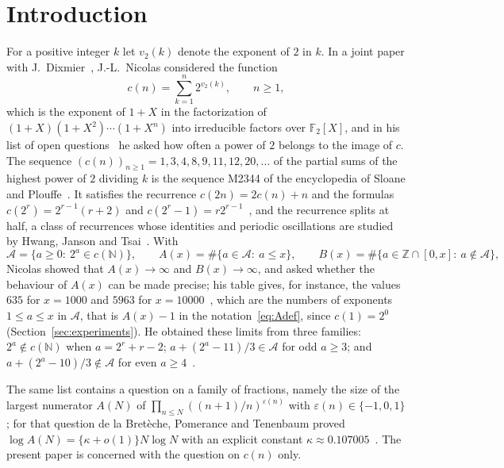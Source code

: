 \documentclass[11pt]{amsart}
\theoremstyle{definition}
\begin{document}
\section{Introduction}
\label{sec:intro}
For a positive integer $k$ let $v_2(k)$ denote the exponent of $2$ in $k$. In a joint paper with J.~Dixmier~\cite{dixmiernicolas2002}, J.-L.~Nicolas considered the function
\begin{equation}
\label{eq:cdef}
c(n)=\sum_{k=1}^{n}2^{v_2(k)},\qquad n\ge1,
\end{equation}
which is the exponent of $1+X$ in the factorization of $(1+X)(1+X^2)\cdots(1+X^n)$ into irreducible factors over $\mathbb{F}_2[X]$, and in his list of open questions~\cite{nicolas2005open} he asked how often a power of $2$ belongs to the image of $c$. The sequence $(c(n))_{n\ge1}=1,3,4,8,9,11,12,20,\dots$ of the partial sums of the highest power of $2$ dividing $k$ is the sequence M2344 of the encyclopedia of Sloane and Plouffe~\cite{sloaneplouffe1995}. It satisfies the recurrence $c(2n)=2c(n)+n$ and the formulas $c(2^r)=2^{r-1}(r+2)$ and $c(2^r-1)=r2^{r-1}$~\cite{nicolas2005open}, and the recurrence splits at half, a class of recurrences whose identities and periodic oscillations are studied by Hwang, Janson and Tsai~\cite{hwangjansontsai2024}. With
\begin{equation}
\label{eq:Adef}
\mathcal{A}=\{a\ge0:\ 2^a\in c(\mathbb{N})\},\qquad A(x)=\#\{a\in\mathcal{A}:\ a\le x\},\qquad B(x)=\#\{a\in\mathbb{Z}\cap[0,x]:\ a\notin\mathcal{A}\},
\end{equation}
Nicolas showed that $A(x)\to\infty$ and $B(x)\to\infty$, and asked whether the behaviour of $A(x)$ can be made precise; his table gives, for instance, the values $635$ for $x=1000$ and $5963$ for $x=10000$~\cite{nicolas2005open}, which are the numbers of exponents $1\le a\le x$ in $\mathcal{A}$, that is $A(x)-1$ in the notation~\eqref{eq:Adef}, since $c(1)=2^0$ (Section~\ref{sec:experiments}). He obtained these limits from three families: $2^a\notin c(\mathbb{N})$ when $a=2^r+r-2$; $a+(2^a-11)/3\in\mathcal{A}$ for odd $a\ge3$; and $a+(2^a-10)/3\notin\mathcal{A}$ for even $a\ge4$~\cite{nicolas2005open}.

The same list contains a question on a family of fractions, namely the size of the largest numerator $A(N)$ of $\prod_{n\le N}((n+1)/n)^{\varepsilon(n)}$ with $\varepsilon(n)\in\{-1,0,1\}$; for that question de la Bret\`eche, Pomerance and Tenenbaum proved $\log A(N)=\{\kappa+o(1)\}N\log N$ with an explicit constant $\kappa\approx0.107005$~\cite{bretechepomerancetenenbaum2005}. The present paper is concerned with the question on $c(n)$ only.
\end{document}
